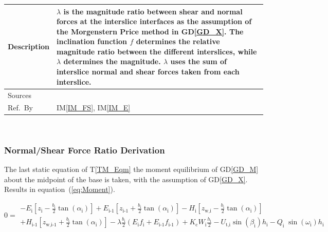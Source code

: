 \documentclass[12pt]{article}
\newcommand{\tref}[1]{T\ref{#1}}
\newcommand{\iref}[1]{IM\ref{#1}}
\newcommand{\dref}[1]{GD\ref{#1}}
\begin{document}
\begin{minipage}{\textwidth}
\begin{tabular}{| p{1.5cm} | p{14cm} |}
\hline Description & $\lambda$ is the magnitude ratio between shear
and normal forces at the interslice interfaces as the assumption of
the Morgenstern Price method in \dref{GD_X}. The inclination function
$f$ determines the relative magnitude ratio between the different
interslices, while $\lambda$ determines the magnitude. $\lambda$ uses
the sum of interslice normal and shear forces taken from each
interslice. \\

\hline Sources& \cite{ZhuEtAl2005}\\

\hline Ref.\ By & \iref{IM_FS}, \iref{IM_E} \\

\hline
\end{tabular}
\end{minipage}\\


\subsubsection*{Normal/Shear Force Ratio Derivation}

 The last static equation of \tref{TM_Eqm} the moment equilibrium of
 \dref{GD_M} about the midpoint of the base is taken, with the
 assumption of \dref{GD_X}. Results in equation~(\ref{eq:Moment}).

\begin{equation}\label{eq:Moment}
  0 = \begin{array}{l} - {E}_{\text{i}} \left[ {z_{\text{i}}} -
      \frac{b_{\text{i}}}{2} { \tan\left(\alpha_{\text{i}}\right)}
      \right] + {E}_{\text{i-1}} \left[ {z_{\text{i-1}}} +
      \frac{b_{\text{i}}}{2} { \tan\left(\alpha_{\text{i}}\right)}
      \right] - H_{\text{i}}\left[ z_{\text{w,i}} -
      \frac{b_{\text{i}}}{2} { \tan\left(\alpha_{\text{i}}\right)}
      \right] \\[5pt] + H_{\text{i-1}}\left[ z_{\text{w,i-1}} +
      \frac{b_{\text{i}}}{2} { \tan\left(\alpha_{\text{i}}\right)}
      \right] -\lambda \frac{b_{\text{i}}}{2} \left( E_{\text{i}}
    f_{\text{i}} + E_{\text{i-1}} f_{\text{i-1}} \right) +
    K_{\text{c}} W_{\text{i}} \frac{h_{\text{i}}}{2} - U_{\text{t,i}}
    \sin\left(\beta_{\text{i}}\right) h_{\text{i}} -
    Q_{\text{i}}\;{\sin\left(\omega_{\text{i}}\right)}
    h_{\text{i}} \end{array}
\end{equation} 
\end{document}
